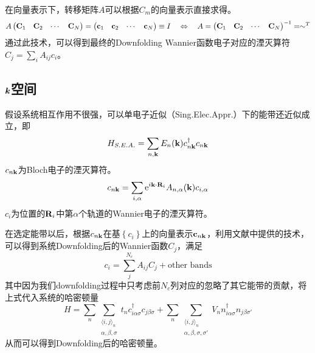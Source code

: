 \documentclass{article}
\begin{document}
	在向量表示下，转移矩阵$A$可以根据$C_m$的向量表示直接求得。
	\begin{equation}
		A\begin{pmatrix}
		\vb{C}_1& \vb{C}_2&\cdots &\vb{C}_N
	\end{pmatrix}
	=\begin{pmatrix}
		\vb{c}_1& \vb{c}_2&\cdots &\vb{c}_N
	\end{pmatrix}\equiv I\quad \Leftrightarrow\quad  A=
	\begin{pmatrix}
	\vb{C}_1& \vb{C}_2&\cdots &\vb{C}_N
	\end{pmatrix}^{-1}=\sim ^T
	\end{equation}
	通过此技术，可以得到最终的Downfolding Wannier函数电子对应的湮灭算符$C_j=\sum_i A_{ij}c_i$。
	\subsection{$\vb*{k}$空间}
	假设系统相互作用不很强，可以单电子近似（Sing.Elec.Appr.）下的能带还近似成立，即
	\begin{equation}\label{HSEA}
		H_{S.E.A.}=\sum_{n,\vb{k}}E_n(\vb{k})c_{n\vb{k}}^\dagger c_{n\vb{k}}
	\end{equation}
	$c_{n\vb{k}}$为Bloch电子的湮灭算符。
	\begin{equation}\label{bloch-oribital}
		c_{n\vb{k}} = \sum_{i,\alpha} \mathrm{e}^{i\vb{k}\cdot \vb{R}_i}A_{n,\alpha}(\vb{k})c_{i,\alpha}
	\end{equation}
	$c_{i}$为位置的$\vb{R}_i$中第$\alpha$个轨道的Wannier电子的湮灭算符。
	
	在选定能带以后，根据$c_{n\vb{k}}$在基$\left\{c_i\right\}$上的向量表示$\vb{c}_{n\vb{k}}$，利用文献\cite{PhysRevB.108.L161111}中提供的技术，可以得到系统Downfolding后的Wannier函数$C_j$，满足
	\begin{equation}
		c_i=\sum_{j}^{N_c}A_{ij}C_j + \text{other bands}
	\end{equation}
	其中因为我们downfolding过程中只考虑前$N_c$列对应的忽略了其它能带的贡献，将上式代入系统的哈密顿量
	\begin{equation}\label{Hamiltonian}
		H = \sum_n\sum_{
			\substack{\langle i,j \rangle_n\\ 
				\alpha,\beta,\sigma}
			}t_nc_{i\alpha\sigma}^\dagger c_{j\beta\sigma}+\sum_n\sum_{
						\substack{\langle i,j \rangle_n\\ 
				\alpha,\beta,\sigma,\sigma'}
				}V_n n_{i\alpha\sigma}^\dagger n_{j\beta\sigma'}
	\end{equation}
	从而可以得到Downfolding后的哈密顿量。
\end{document}
